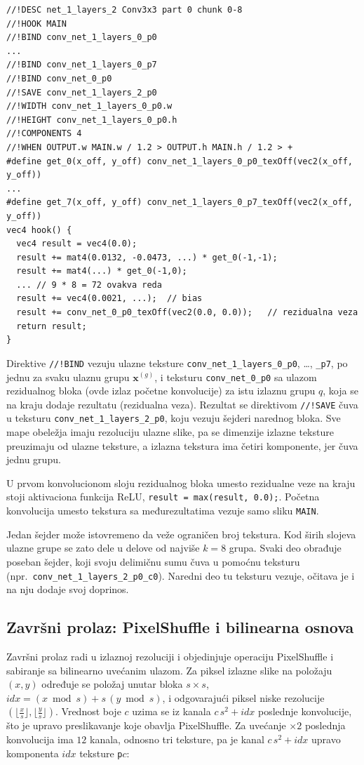 \documentclass[12pt,a4paper]{article}
\begin{document}
\begin{verbatim}
//!DESC net_1_layers_2 Conv3x3 part 0 chunk 0-8
//!HOOK MAIN
//!BIND conv_net_1_layers_0_p0
...
//!BIND conv_net_1_layers_0_p7
//!BIND conv_net_0_p0
//!SAVE conv_net_1_layers_2_p0
//!WIDTH conv_net_1_layers_0_p0.w
//!HEIGHT conv_net_1_layers_0_p0.h
//!COMPONENTS 4
//!WHEN OUTPUT.w MAIN.w / 1.2 > OUTPUT.h MAIN.h / 1.2 > +
#define get_0(x_off, y_off) conv_net_1_layers_0_p0_texOff(vec2(x_off, y_off))
...
#define get_7(x_off, y_off) conv_net_1_layers_0_p7_texOff(vec2(x_off, y_off))
vec4 hook() {
  vec4 result = vec4(0.0);
  result += mat4(0.0132, -0.0473, ...) * get_0(-1,-1);
  result += mat4(...) * get_0(-1,0);
  ... // 9 * 8 = 72 ovakva reda
  result += vec4(0.0021, ...);  // bias
  result += conv_net_0_p0_texOff(vec2(0.0, 0.0));   // rezidualna veza
  return result;
}
\end{verbatim}

Direktive \texttt{//!BIND} vezuju ulazne teksture \texttt{conv\_net\_1\_layers\_0\_p0}, \dots, \texttt{\_p7}, po jednu za svaku ulaznu grupu $\mathbf{x}^{(g)}$, i teksturu \texttt{conv\_net\_0\_p0} sa ulazom rezidualnog bloka (ovde izlaz početne konvolucije) za istu izlaznu grupu $q$, koja se na kraju dodaje rezultatu (rezidualna veza). Rezultat se direktivom \texttt{//!SAVE} čuva u teksturu \texttt{conv\_net\_1\_layers\_2\_p0}, koju vezuju šejderi narednog bloka. Sve mape obeležja imaju rezoluciju ulazne slike, pa se dimenzije izlazne teksture preuzimaju od ulazne teksture, a izlazna tekstura ima četiri komponente, jer čuva jednu grupu.

U prvom konvolucionom sloju rezidualnog bloka umesto rezidualne veze na kraju stoji aktivaciona funkcija ReLU, \texttt{result = max(result, 0.0);}. Početna konvolucija umesto tekstura sa međurezultatima vezuje samo sliku \texttt{MAIN}.

Jedan šejder može istovremeno da veže ograničen broj tekstura. Kod širih slojeva ulazne grupe se zato dele u delove od najviše $k = 8$ grupa. Svaki deo obrađuje poseban šejder, koji svoju delimičnu sumu čuva u pomoćnu teksturu (npr.\ \texttt{conv\_net\_1\_layers\_2\_p0\_c0}). Naredni deo tu teksturu vezuje, očitava je i na nju dodaje svoj doprinos.

\subsection{Završni prolaz: PixelShuffle i bilinearna osnova}
\label{sec:gl_pixelshuffle}

Završni prolaz radi u izlaznoj rezoluciji i objedinjuje operaciju PixelShuffle i sabiranje sa bilinearno uvećanim ulazom. Za piksel izlazne slike na položaju $(x,y)$ određuje se položaj unutar bloka $s\times s$, $\mathit{idx} = (x \bmod s) + s\,(y \bmod s)$, i odgovarajući piksel niske rezolucije $(\lfloor \frac{x}{s} \rfloor, \lfloor \frac{y}{s} \rfloor)$. Vrednost boje $c$ uzima se iz kanala $c\,s^2 + \mathit{idx}$ poslednje konvolucije, što je upravo preslikavanje koje obavlja PixelShuffle. Za uvećanje $\times2$ poslednja konvolucija ima $12$ kanala, odnosno tri teksture, pa je kanal $c\,s^2+\mathit{idx}$ upravo komponenta $\mathit{idx}$ teksture \texttt{p}$c$:
\end{document}
